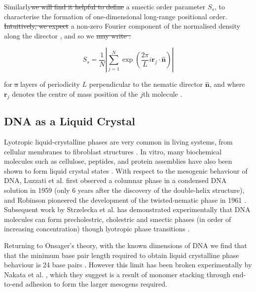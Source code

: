 \documentclass[11pt, a4paper]{article} %
\providecommand{\DIFadd}[1]{{\protect\color{blue}\uwave{#1}}} %
\providecommand{\DIFdel}[1]{{\protect\color{red}\sout{#1}}}                      %
\providecommand{\DIFaddbegin}{} %
\providecommand{\DIFaddend}{} %
\providecommand{\DIFdelbegin}{} %
\providecommand{\DIFdelend}{} %
\begin{document}

Similarly\DIFdelbegin \DIFdel{we will find it helpful to define }\DIFdelend \DIFaddbegin \DIFadd{, \textcolor{forestgreen}{it is helpful to define} }\DIFaddend a smectic order parameter $S_{s}$, to characterise the formation of one-dimensional long-range positional order. \DIFdelbegin \DIFdel{Intuitively, we expect }\DIFdelend \DIFaddbegin \DIFadd{\textcolor{forestgreen}{We can expect} }\DIFaddend a non-zero Fourier component of the normalised density along the director \cite{Polson1997}, and so we \DIFdelbegin \DIFdel{may write
:
}\DIFdelend \DIFaddbegin \DIFadd{can write
}\DIFaddend 

\begin{equation}
S_{s} = \frac{1}{N} \left\lvert \sum_{j=1}^{N} \exp \left( {\frac{2\pi}{L}i\textbf{r}_{j} \cdot \boldsymbol{\hat{n}}} \right) \right\rvert
\end{equation}

for \DIFdelbegin \DIFdel{a }\DIFdelend layers of periodicity $L$ perpendicular to the nematic director $\boldsymbol{\hat{n}}$, and where $\textbf{r}_{j}$ denotes the centre of mass position of the $j$th molecule \cite{Dussi2018}.


\subsection{DNA as a Liquid Crystal} 
Lyotropic liquid-crystalline phases are very common in living systems, from cellular membranes to fibroblast structures \cite{Stewart1966, Rey2013}. In vitro, many biochemical molecules such as cellulose, peptides, and protein assemblies have also been shown to form liquid crystal states \cite{Zhao2019}. With respect to the mesogenic behaviour of DNA, Luzzati et al. first observed a columnar phase in a condensed DNA solution in 1959 (only 6 years after the discovery of the double-helix structure), and Robinson pioneered the development of the twisted-nematic phase in 1961 \cite{Luzzati1959, Robinson1961}. Subsequent work by Strzelecka et al. has demonstrated experimentally that DNA molecules can form precholestric, cholestric and smectic phases (in order of increasing concentration) though lyotropic phase transitions \cite{Strzelecka1988}. 

Returning to Onsager's theory, with the known dimensions of DNA we find that that the minimum base pair length required to obtain liquid crystalline phase behaviour is 24 base pairs \cite{Bolhuis1997}. However this limit has been broken experimentally by Nakata et al. \cite{Nakata2007, Zanchetta2008}, which they suggest is a result of monomer stacking through end-to-end adhesion to form the larger mesogens required.
\end{document}
